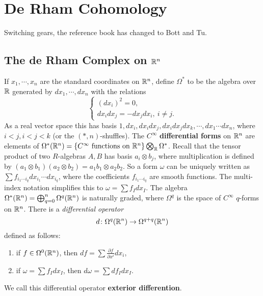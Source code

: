 \section{De Rham Cohomology} 

Switching gears, the reference book has changed to Bott and Tu. 
\subsection{The de Rham Complex on $\mathbb{R}^n $}
   If $x_1,\cdots ,x_n $ are the standard coordinates on $\mathbb{R}^n $, define $\Omega^*$ to be the algebra over $\mathbb{R}$ generated by $dx_1,\cdots ,dx_n $ with the relations
   \[
   \begin{cases}
       (dx_i )^2=0,\\
       dx_i dx_j =-dx_j dx_i ,\ i\neq j.
   \end{cases}
   \] 
   As a real vector space this has basis $1, dx_i ,dx_i dx_j , dx_i dx_j dx_k,\cdots ,dx_1\cdots dx_n $, where $i<j,i<j<k$ (or the $(*,n)$-shuffles). The $C^{\infty}$ \textbf{differential forms} on $\mathbb{R}^n $ are elements of $\Omega^* (\mathbb{R}^n )= \{C^{\infty}\ \text{functions on} \ \mathbb{R}^n \} \bigotimes_{\mathbb{R}}\Omega^*$. Recall that the tensor product of two $R$-algebras $A,B$ has basis $a_i\otimes b_j $, where multiplication is defined by $(a_1\otimes b_1)(a_2\otimes b_2)=a_1b_1\otimes a_2b_2$. So a form $\omega$ can be uniquely written as $\sum f_{i_1\cdots i_q}dx_{i_1}\cdots dx_{i_q}$, where the coefficients $f_{i_1\cdots i_q}$ are smooth functions. The multi-index notation simplifies this to $\omega=\sum f_I dx_I$. The algebra $\Omega^*(\mathbb{R}^n )=\bigoplus _{q=0}^n \Omega^q(\mathbb{R}^n )$ is naturally graded, where $\Omega^q$ is the space of $C^{\infty}$ $q$-forms on $\mathbb{R}^n $. There is a \emph{differential operator} \[
       d \colon \Omega^q(\mathbb{R}^n ) \to \Omega^{q+q}(\mathbb{R}^n )
   \] defined as follows:
   \begin{enumerate}[label=(\roman*)]
   \setlength\itemsep{-.2em}
       \item if $f \in \Omega^0(\mathbb{R}^n )$, then $df=\sum \frac{\partial f}{\partial x^i }dx_i $,
        \item if $\omega=\sum f_I dx_I$, then $d\omega=\sum df_I dx_I$.
   \end{enumerate}We call this differential operator \textbf{exterior differention}.
